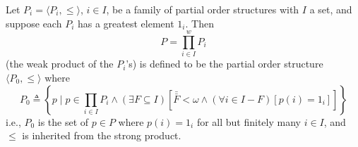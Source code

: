 Let $P_i = \langle P_i, \leq \rangle$, $i \in I$, be a family of partial order structures with $I$ a set, and suppose each $P_i$ has a greatest element $1_i$. Then
$$P = \prod_{i \in I}^{w} P_i$$
(the weak product of the $P_i$'s) is defined to be the partial order structure $\langle P_0, \leq \rangle$ where
$$P_0 \triangleq \left\{ p \mid p \in \prod_{i \in I} P_i \land (\exists F \subseteq I)[\bar{\bar{F}} < \omega \land (\forall i \in I - F)[p(i) = 1_i]] \right\}$$
i.e., $P_0$ is the set of $p \in P$ where $p(i) = 1_i$ for all but finitely many $i \in I$, and $\leq$ is inherited from the strong product.
